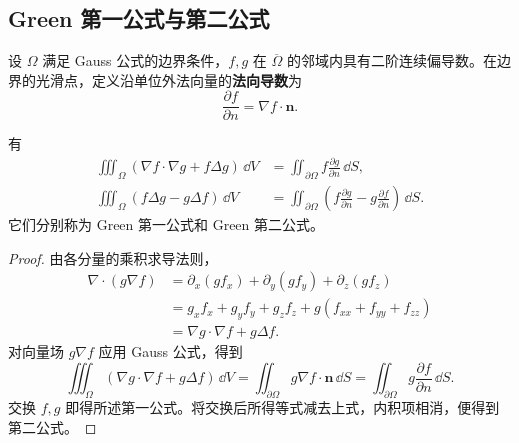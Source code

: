 \subsection*{Green 第一公式与第二公式}
设 $\Omega$ 满足 Gauss 公式的边界条件，$f,g$ 在 $\overline\Omega$ 的邻域内具有二阶连续偏导数。在边界的光滑点，定义沿单位外法向量的\textbf{法向导数}为
\[
\frac{\partial f}{\partial n}=\nabla f\cdot\boldsymbol n.
\]
\begin{proposition}
有
\begin{align*}
\iiint_\Omega(\nabla f\cdot\nabla g+f\Delta g)\,\dd V
&=\displaystyle\iint_{\partial\Omega}f\frac{\partial g}{\partial n}\,\dd S,\\
\iiint_\Omega(f\Delta g-g\Delta f)\,\dd V
&=\displaystyle\iint_{\partial\Omega}\left(f\frac{\partial g}{\partial n}-g\frac{\partial f}{\partial n}\right)\,\dd S.
\end{align*}
它们分别称为 Green 第一公式和 Green 第二公式。
\end{proposition}
\begin{proof}
由各分量的乘积求导法则，
\begin{align*}
\nabla\cdot(g\nabla f)
&=\partial_x(gf_x)+\partial_y(gf_y)+\partial_z(gf_z)\\
&=g_xf_x+g_yf_y+g_zf_z+g(f_{xx}+f_{yy}+f_{zz})\\
&=\nabla g\cdot\nabla f+g\Delta f.
\end{align*}
对向量场 $g\nabla f$ 应用 Gauss 公式，得到
\[
\iiint_\Omega(\nabla g\cdot\nabla f+g\Delta f)\,\dd V
=\displaystyle\iint_{\partial\Omega}g\nabla f\cdot\boldsymbol n\,\dd S
=\displaystyle\iint_{\partial\Omega}g\frac{\partial f}{\partial n}\,\dd S.
\]
交换 $f,g$ 即得所述第一公式。将交换后所得等式减去上式，内积项相消，便得到第二公式。
\end{proof}

